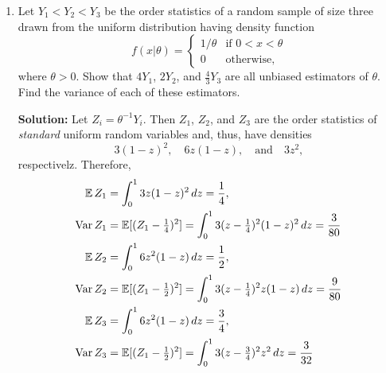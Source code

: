 \documentclass[12pt]{amsart}
\newcommand{\sol}{\bigskip\noindent\textbf{Solution: }}
\begin{document}
\begin{enumerate}
\begin{enumerate}
            \item Let $X_1,\ldots,X_n$ be a random sample from $\cL(\mu, b)$, where $\cL(\mu, b)$
            is the \emph{Laplace distribution} with density
            \[f(x|\mu, b) = \frac1{2b}e^{-|x-\mu|/b}.\]
            Assuming that $b$ is known and that $n$ is odd, Show that the MLE of $\mu$
            is the sample median, $\tilde{X}$. (Hint: Use (a).)

            \sol We minimize the negative $\log$-likelihood function,
            \[
                h(\mu) = \log 2 + \log b + \frac1{b}\sum_{i=1}^n|x - \mu|.
            \]
            For every $b>0$,
            \[
                \argmin_\mu h(\mu) = \argmin_\mu \sum_{i=1}^n|x_i - \mu|.
            \]
            By (a), 
            \[
            \argmin_\mu \sum_{i=1}^n|x_i - \mu| = \tilde x.
            \]
        \end{enumerate}

        \item \cite[Exercise 7.1.3]{HMC} Let $Y_1< Y_2< Y_3$ be the order statistics of
        a random sample of size three drawn from the uniform distribution having density function
    \[f(x|\theta)=\begin{cases}
    1/\theta&\text{if $0<x<\theta$}\\
     0&\text{otherwise,}
    \end{cases}\]
    where $\theta>0$. Show that $4Y_1$, $2Y_2$, and $\frac43Y_3$ are all unbiased estimators of $\theta$.
    Find the variance of each of these estimators.

    \sol
    Let $Z_i=\theta^{-1} Y_i$. Then $Z_1$, $Z_2$, and $Z_3$ are the order statistics of \emph{standard} uniform
    random variables and, thus, have densities
    \[3(1-z)^2,\quad 6z(1-z), \quad\text{and}\quad 3z^2,\]
    respectivelz.
    Therefore,
    \begin{align*}
        \operatorname{\mathbb{E}}{Z_1} &= \int_0^1 3z(1-z)^2\,dz = \frac14,\\
        \operatorname{Var} Z_1 &= \operatorname{\mathbb{E}}[(Z_1 - \tfrac14)^2] = \int_0^13(z - \tfrac14)^2(1-z)^2\,dz = \frac3{80}\\
        \operatorname{\mathbb{E}}{Z_2} &= \int_0^1 6z^2(1-z)\,dz = \frac12,\\
        \operatorname{Var} Z_2 &= \operatorname{\mathbb{E}}[(Z_1 - \tfrac12)^2] = \int_0^13(z - \tfrac14)^2z(1-z)\,dz = \frac9{80}\\
        \operatorname{\mathbb{E}}{Z_3} &= \int_0^1 6z^2(1-z)\,dz = \frac34,\\
        \operatorname{Var} Z_3 &= \operatorname{\mathbb{E}}[(Z_1 - \tfrac12)^2] = \int_0^13(z - \tfrac34)^2z^2\,dz = \frac3{32}\\
    \end{align*}


\end{enumerate}
\end{document}
